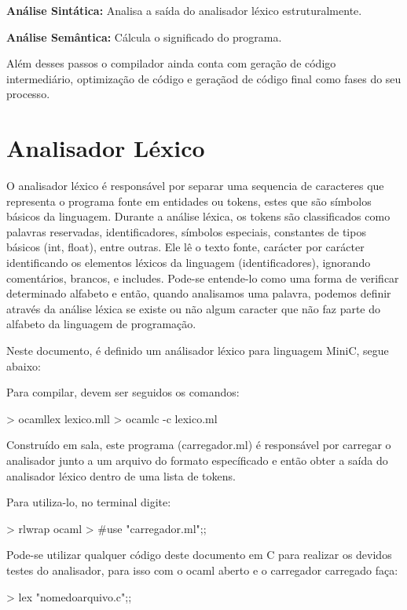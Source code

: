 \documentclass[12pt,a4paper,twoside]{report}
\begin{document}
\textbf{Análise Sintática:}
Analisa a saída do analisador léxico estruturalmente.

\textbf{Análise Semântica:}
Cálcula o significado do programa.

Além desses passos o compilador ainda conta com geração de código intermediário, optimização de código e geraçãod de código final como fases do seu processo.

\section{Analisador Léxico}
O analisador léxico é responsável por separar uma sequencia de caracteres que representa o programa fonte em entidades ou tokens, estes que são símbolos básicos da linguagem. Durante a análise léxica, os tokens são classificados como palavras reservadas, identificadores, símbolos especiais, constantes de tipos básicos (int, float), entre outras. Ele lê o texto fonte, carácter por carácter identificando os elementos léxicos da linguagem (identificadores), ignorando comentários, brancos, e includes. Pode-se entende-lo  como uma forma de verificar determinado alfabeto e então, quando analisamos uma palavra, podemos definir através da análise léxica se existe ou não algum caracter que não faz parte do alfabeto da linguagem de programação.

Neste documento, é definido um análisador léxico para linguagem MiniC, segue abaixo:


Para compilar, devem ser seguidos os comandos:
\begin{terminal}
> ocamllex lexico.mll
> ocamlc -c lexico.ml
\end{terminal}

Construído em sala, este programa (carregador.ml) é responsável por carregar o analisador junto a um arquivo do formato específicado e então obter a saída do analisador léxico dentro de uma lista de tokens.


Para utiliza-lo, no terminal digite:
\begin{terminal}
> rlwrap ocaml
> #use "carregador.ml";;
\end{terminal}

Pode-se utilizar qualquer código deste documento em C para realizar os devidos testes do analisador, para isso com o ocaml aberto e o carregador carregado faça:
\begin{terminal}
> lex "nomedoarquivo.c";;
\end{terminal}
\end{document}
